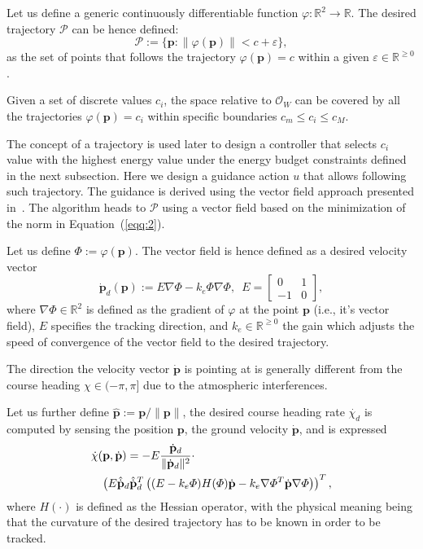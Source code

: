 \documentclass[letterpaper,10pt,conference]{ieeeconf}
\begin{document}
Let us define a generic continuously differentiable function $\varphi:\mathbb{R}^2\rightarrow\mathbb{R}$. The desired trajectory $\mathcal{P}$ can be hence defined:
\begin{equation}\label{eqq:2}
  \mathcal{P}:=\{\mathbf{p}:\|\varphi(\mathbf{p})\|<c+\varepsilon\},
\end{equation}
as the set of points that follows the trajectory $\varphi(\mathbf{p})=c$ within a given $\varepsilon\in\mathbb{R}^{\geq 0}$. 

Given a set of discrete values $c_i$, the space relative to $\mathcal{O}_W$ can be covered by all the trajectories $\varphi(\mathbf{p})=c_i$ within specific boundaries $c_m\leq c_i\leq c_M$.

The concept of a trajectory is used later to design a controller that selects $c_i$ value with the highest energy value under the energy budget constraints defined in the next subsection. Here we design a guidance action $u$ that allows following such trajectory. The guidance is derived using the vector field approach presented in~\cite{de2017guidance}. The algorithm heads to $\mathcal{P}$ using a vector field based on the minimization of the norm in Equation~(\ref{eqq:2}).

Let us define $\varPhi:=\varphi(\mathbf{p})$. The vector field is hence defined as a desired velocity vector
\begin{equation}\label{eqq:3}
  \dot{\mathbf{p}}_d(\mathbf{p}):=E\nabla\varPhi-k_e\varPhi\nabla\varPhi,\,\,\,E=\begin{bmatrix}
    0&1\\-1&0
  \end{bmatrix},
\end{equation}
where $\nabla\varPhi\in\mathbb{R}^2$ is defined as the gradient of $\varphi$ at the point $\mathbf{p}$ (i.e., it's vector field), $E$ specifies the tracking direction, and $k_e\in\mathbb{R}^{\geq 0}$ the gain which adjusts the speed of convergence of the vector field to the desired trajectory.

The direction the velocity vector $\dot{\mathbf{p}}$ is pointing at is generally different from the course heading $\chi\in(-\pi,\pi]$ due to the atmospheric interferences.

Let us further define $\hat{\mathbf{p}}:=\mathbf{p}/\|\mathbf{p}\|$, the desired course heading rate $\dot{\chi_d}$ is computed by sensing the position $\mathbf{p}$, the ground velocity $\dot{\mathbf{p}}$, and is expressed
\begin{equation}\label{eqq:4}\begin{split}
  &\dot{\chi}(\mathbf{p},\dot{\mathbf{p}})=-E\frac{\dot{\mathbf{p}}_d}{\|\dot{\mathbf{p}}_d\|^2}\cdot\\
  &\hspace{2ex}\left( E\hat{\dot{\mathbf{p}}}_d\hat{\dot{\mathbf{p}}}_d^T\left( (E-k_e\varPhi)H(\varPhi)\dot{\mathbf{p}}-k_e\nabla\varPhi^T\dot{\mathbf{p}}\nabla\varPhi \right) \right)^T,
\end{split}
\end{equation} 
where $H(\cdot)$ is defined as the Hessian operator, with the physical meaning being that the curvature of the desired trajectory has to be known in order to be tracked.
\end{document}
